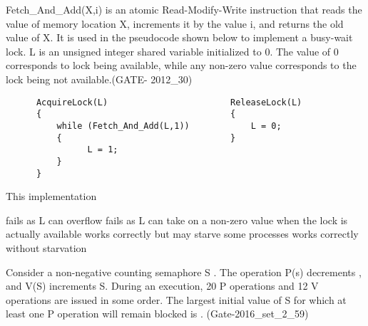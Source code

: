 
\begin{questyle}

  \question  Fetch\_And\_Add(X,i) is an atomic Read-Modify-Write instruction that reads the value of memory
             location X, increments it by the value i, and returns the old value of X.
             It is used in the pseudocode shown below to implement a busy-wait lock.
             L is an unsigned integer shared variable initialized to 0.
             The value of 0 corresponds to lock being available, while any non-zero value corresponds to the lock
             being not available.(GATE- 2012\_30)

  \begin{lstlisting}
      AcquireLock(L)                        ReleaseLock(L)
      {                                     {
          while (Fetch_And_Add(L,1))            L = 0;
          {                                 }
                L = 1;
          }
      }

  \end{lstlisting}
  This implementation

  \begin{choices}
    \choice  fails as L can overflow
    \correctchoice  fails as L can take on a non-zero value when the lock is actually available
    \choice  works correctly but may starve some processes
    \choice  works correctly without starvation
  \end{choices}

  \end{questyle}




\begin{questyle}

  \question  Consider a non-negative counting semaphore S . The operation P(s) decrements , and V(S) increments S.
             During an execution, 20 P operations and 12 V operations are issued in some order.
             The largest initial value of S for which at least one P operation will remain blocked is \fillin[7]. (Gate-2016\_set\_2\_59)
  \end{questyle}



